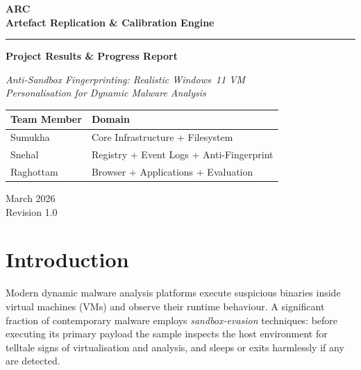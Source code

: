 \documentclass[12pt,a4paper]{article}
\begin{document}
\begin{titlepage}
  \centering
  \vspace*{1.5cm}

  {\Huge\bfseries\color{arcblue}
    ARC\\[0.4em]
    Artefact Replication \& Calibration Engine}

  \vspace{0.6cm}
  \rule{0.7\linewidth}{1.5pt}
  \vspace{0.4cm}

  {\Large\bfseries Project Results \& Progress Report}

  \vspace{0.5cm}
  {\large\textit{Anti-Sandbox Fingerprinting: Realistic Windows~11 VM\\
  Personalisation for Dynamic Malware Analysis}}

  \vspace{1.2cm}

  \begin{tabular}{ll}
    \textbf{Team Member}   & \textbf{Domain} \\
    \midrule
    Sumukha  & Core Infrastructure + Filesystem \\
    Snehal   & Registry + Event Logs + Anti-Fingerprint \\
    Raghottam & Browser + Applications + Evaluation \\
  \end{tabular}

  \vfill

  {\large March 2026}\\[0.3em]
  {\normalsize Revision 1.0}
\end{titlepage}

\tableofcontents
\newpage

\section{Introduction}
\label{sec:intro}

Modern dynamic malware analysis platforms execute suspicious binaries inside
virtual machines (VMs) and observe their runtime behaviour. A significant
fraction of contemporary malware employs \emph{sandbox-evasion} techniques:
before executing its primary payload the sample inspects the host environment
for telltale signs of virtualisation and analysis, and sleeps or exits
harmlessly if any are detected.
\end{document}
